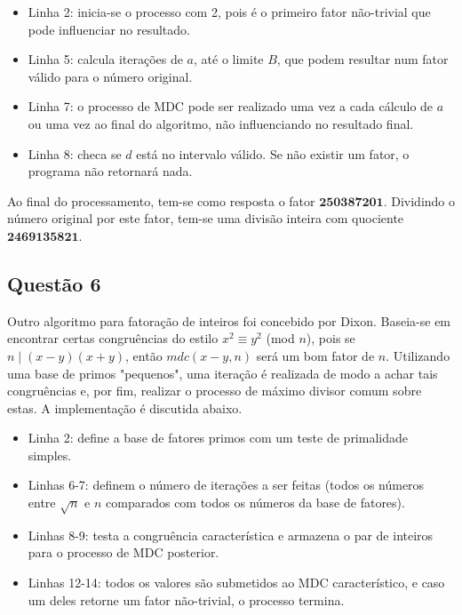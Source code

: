 \documentclass{article}
\begin{document}
\begin{itemize}

    

    \item Linha 2: inicia-se o processo com 2, pois é o primeiro fator
        não-trivial que pode influenciar no resultado.

    \item Linha 5: calcula iterações de $a$, até o limite $B$, que podem
        resultar num fator válido para o número original.

    \item Linha 7: o processo de MDC pode ser realizado uma vez a cada
        cálculo de $a$ ou uma vez ao final do algoritmo, não influenciando no
        resultado final.

    \item Linha 8: checa se $d$ está no intervalo válido. Se não existir um
        fator, o programa não retornará nada.

\end{itemize}

Ao final do processamento, tem-se como resposta o fator $\textbf{250387201}$.
Dividindo o número original por este fator, tem-se uma divisão inteira com
quociente $\textbf{2469135821}$.

\subsection*{Questão 6}

Outro algoritmo para fatoração de inteiros foi concebido por Dixon. Baseia-se
em encontrar certas congruências do estilo $x^2 \equiv y^2$ (mod $n$), pois se
$n \mid (x-y)(x+y)$, então $mdc(x-y, n)$ será um bom fator de $n$. Utilizando
uma base de primos "pequenos", uma iteração é realizada de modo a achar tais
congruências e, por fim, realizar o processo de máximo divisor comum sobre
estas. A implementação é discutida abaixo.

\begin{itemize}

    

    \item Linha 2: define a base de fatores primos com um teste de primalidade
        simples.

    \item Linhas 6-7: definem o número de iterações a ser feitas (todos os
        números entre $\sqrt{n}$ e $n$ comparados com todos os números da base
        de fatores).

    \item Linhas 8-9: testa a congruência característica e armazena o par de
        inteiros para o processo de MDC posterior.

    \item Linhas 12-14: todos os valores são submetidos ao MDC característico,
        e caso um deles retorne um fator não-trivial, o processo termina.

\end{itemize}
\end{document}

